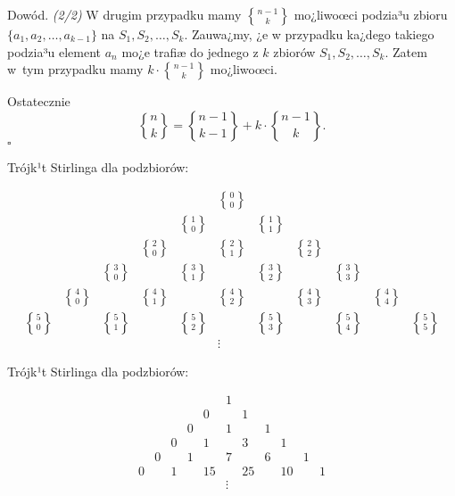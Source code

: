 \documentclass[a4paper,10pt]{beamer}
\begin{document}
\begin{frame}

\begin{block}{Dowód. \it(2/2)}
W drugim przypadku mamy $\displaystyle{{n-1}\brace k}$ mo¿liwoœci podzia³u zbioru $\{a_1,a_2,\ldots,a_{k-1}\}$ na $S_1,S_2,\ldots,S_k$. Zauwa¿my, ¿e w przypadku ka¿dego takiego podzia³u element $a_n$ mo¿e trafiæ do jednego z $k$ zbiorów $S_1,S_2,\ldots,S_k$. Zatem w~tym przypadku mamy $\displaystyle k\cdot {{n-1}\brace k}$ mo¿liwoœci.

\smallskip

Ostatecznie $${n\brace k}={{n-1}\brace{k-1}}+k\cdot{{n-1}\brace k}.$$
\hfill$\square$
\end{block}
\end{frame}

\begin{frame}
Trójk¹t Stirlinga dla podzbiorów:

$$\begin{array}{ccccccccccc}
&&&&&{0\brace0}&&&&&\\
&&&&{1\brace0}&&{1\brace1}&&&&\\
&&&{2\brace0}&&{2\brace1}&&{2\brace2}&&&\\
&&{3\brace0}&&{3\brace1}&&{3\brace2}&&{3\brace3}&&\\
&{4\brace0}&&{4\brace1}&&{4\brace2}&&{4\brace3}&&{4\brace4}&\\
{5\brace0}&&{5\brace1}&&{5\brace2}&&{5\brace3}&&{5\brace4}&&{5\brace5}\\
&&&&&\vdots&&&&&
\end{array}$$

\bigskip

Trójk¹t Stirlinga dla podzbiorów:

$$\begin{array}{ccccccccccc}
&&&&&1&&&&&\\
&&&&0&&1&&&&\\
&&&0&&1&&1&&&\\
&&0&&1&&3&&1&&\\
&0&&1&&7&&6&&1&\\
0&&1&&15&&25&&10&&1\\
&&&&&\vdots&&&&&
\end{array}
$$

\end{frame}
\end{document}
